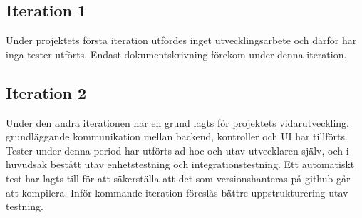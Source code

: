 \documentclass[10pt]{article}
\begin{document}
\subsection{Iteration 1}
Under projektets första iteration utfördes inget utvecklingsarbete och därför har inga tester utförts. Endast dokumentskrivning förekom under denna iteration.
\subsection{Iteration 2}
Under den andra iterationen har en grund lagts för projektets vidarutveckling. grundläggande kommunikation mellan backend, kontroller och UI har tillförts. Tester under denna period har utförts ad-hoc och utav utvecklaren själv, och i huvudsak bestått utav enhetstestning och integrationstestning. Ett automatiskt test har lagts till för att säkerställa att det som versionshanteras på github går att kompilera. Inför kommande iteration föreslås bättre uppstrukturering utav testning.
\end{document}
